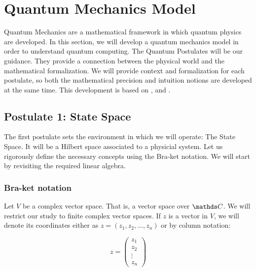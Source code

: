 
\chapter{Quantum Mechanics Model}


Quantum Mechanics are a mathematical framework in which quantum physics are developed. In this section, we will develop a quantum mechanics model in order to understand quantum computing. The Quantum Postulates will be our guidance. They provide a connection between the physical world and the mathematical formalization. We will provide context and formalization for each postulate, so both the mathematical precision and intuition notions are developed at the same time. This development is based on \cite{Nielsen2002}, \cite{Manzano2020} and \cite{Bayens2019}.


\section{Postulate 1: State Space}


The first postulate sets the environment in which we will operate: The State Space. It will be a Hilbert space associated to a physicial system. Let us rigorously define the necessary concepts using the Bra-ket notation. We will start by revisiting the required linear algebra.


\subsection{Bra-ket notation}


Let $V$ be a complex vector space. That is, a vector space over $\C$. We will restrict our study to finite complex vector spaces. If $z$ is a vector in $V$, we will denote its coordinates either as $z = (z_1, z_2, \dotsc, z_n)$ or by column notation:

$$ z = 
\begin{pmatrix}
	z_1\\
	z_2 \\
	\vdots \\
	z_n
\end{pmatrix}
$$

